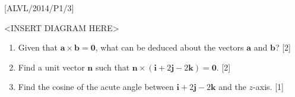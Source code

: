 \item {[}ALVL/2014/P1/3{]}
\noindent \begin{center}
<INSERT DIAGRAM HERE>
\par\end{center}
\begin{enumerate}
\item Given that $\mathbf{a}\times\mathbf{b}=\mathbf{0}$, what can be deduced
about the vectors $\mathbf{a}$ and $\mathbf{b}$?\hfill{} {[}2{]}
\item Find a unit vector $\mathbf{n}$ such that $\mathbf{n}\times\left(\mathbf{i}+2\mathbf{j}-2\mathbf{k}\right)=\mathbf{0}$.\hfill{}
{[}2{]}
\item Find the cosine of the acute angle between $\mathbf{i}+2\mathbf{j}-2\mathbf{k}$
and the $z$-axis.\hfill{} {[}1{]}
\end{enumerate}
